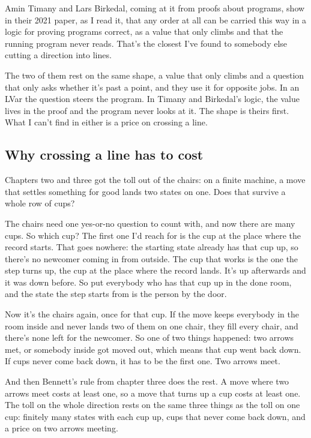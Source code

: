 \documentclass[11pt,twoside]{article}
\theoremstyle{thielethm}
\theoremstyle{thieledef}
\theoremstyle{thieledef}
\theoremstyle{thieledef}
\theoremstyle{thielethm}
\theoremstyle{thieleobs}
\theoremstyle{thielethm}
\begin{document}
Amin Timany and Lars Birkedal, coming at it from proofs about programs, show in their 2021 paper, as I read it, that any order at all can be carried this way in a logic for proving programs correct, as a value that only climbs and that the running program never reads. That's the closest I've found to somebody else cutting a direction into lines.

The two of them rest on the same shape, a value that only climbs and a question that only asks whether it's past a point, and they use it for opposite jobs. In an LVar the question steers the program. In Timany and Birkedal's logic, the value lives in the proof and the program never looks at it. The shape is theirs first. What I can't find in either is a price on crossing a line.

\subsection{Why crossing a line has to cost}

Chapters two and three got the toll out of the chairs: on a finite machine, a move that settles something for good lands two states on one. Does that survive a whole row of cups?

The chairs need one yes-or-no question to count with, and now there are many cups. So which cup? The first one I'd reach for is the cup at the place where the record starts. That goes nowhere: the starting state already has that cup up, so there's no newcomer coming in from outside. The cup that works is the one the step turns up, the cup at the place where the record lands. It's up afterwards and it was down before. So put everybody who has that cup up in the done room, and the state the step starts from is the person by the door.

Now it's the chairs again, once for that cup. If the move keeps everybody in the room inside and never lands two of them on one chair, they fill every chair, and there's none left for the newcomer. So one of two things happened: two arrows met, or somebody inside got moved out, which means that cup went back down. If cups never come back down, it has to be the first one. Two arrows meet.

And then Bennett's rule from chapter three does the rest. A move where two arrows meet costs at least one, so a move that turns up a cup costs at least one. The toll on the whole direction rests on the same three things as the toll on one cup: finitely many states with each cup up, cups that never come back down, and a price on two arrows meeting.
\end{document}

